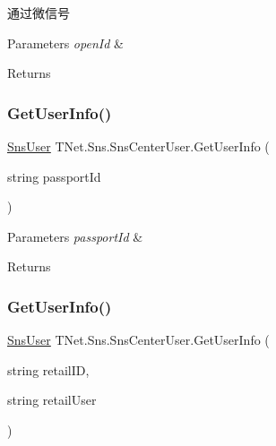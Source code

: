 通过微信号 


\begin{DoxyParams}{Parameters}
{\em open\+Id} & \\
\hline
\end{DoxyParams}
\begin{DoxyReturn}{Returns}

\end{DoxyReturn}
\mbox{\label{class_t_net_1_1_sns_1_1_sns_center_user_ab96e678bd2b50fd3c5f395c119d4ca50}} 
\subsubsection{\texorpdfstring{Get\+User\+Info()}{GetUserInfo()}\hspace{0.1cm}{\footnotesize\ttfamily [1/2]}}
{\footnotesize\ttfamily \mbox{\hyperlink{class_t_net_1_1_sns_1_1_sns_user}{Sns\+User}} T\+Net.\+Sns.\+Sns\+Center\+User.\+Get\+User\+Info (\begin{DoxyParamCaption}\item[{string}]{passport\+Id }\end{DoxyParamCaption})}






\begin{DoxyParams}{Parameters}
{\em passport\+Id} & \\
\hline
\end{DoxyParams}
\begin{DoxyReturn}{Returns}

\end{DoxyReturn}
\mbox{\label{class_t_net_1_1_sns_1_1_sns_center_user_af46e361389c79d0524b6c0954cf25253}} 
\subsubsection{\texorpdfstring{Get\+User\+Info()}{GetUserInfo()}\hspace{0.1cm}{\footnotesize\ttfamily [2/2]}}
{\footnotesize\ttfamily \mbox{\hyperlink{class_t_net_1_1_sns_1_1_sns_user}{Sns\+User}} T\+Net.\+Sns.\+Sns\+Center\+User.\+Get\+User\+Info (\begin{DoxyParamCaption}\item[{string}]{retail\+ID,  }\item[{string}]{retail\+User }\end{DoxyParamCaption})}






